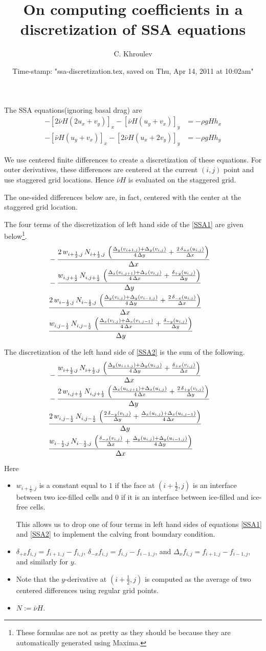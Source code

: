 \documentclass{amsart}
\date{Time-stamp: "ssa-discretization.tex, saved on Thu, Apr 14, 2011 at 10:02am"}
\begin{document}
\title{On computing coefficients in a discretization of SSA equations}
\author{C. Khroulev}
\maketitle

The SSA equations(ignoring basal drag) are
\begin{align}
-\left[ 2\bar\nu H\left( 2u_{x} + v_{y}\right)\right]_{x} - \left[\bar\nu
  H\left(u_{y}+v_{x} \right) \right]_{y} &= - \rho gH h_{x} \label{SSA1} \\
-\left[ \bar\nu H\left( u_{y} + v_{x} \right)\right]_{x} - \left[2\bar\nu
  H\left(u_{x}+2v_{y}  \right) \right]_{y} &= -\rho gH h_{y} \label{SSA2}
\end{align}

We use centered finite differences to create a discretization of these
equations. For outer derivatives, these differences are centered at the current
$(i,j)$ point and use staggered grid locations. Hence $\bar \nu H$ is evaluated on the staggered grid.

The one-sided differences below are, in fact, centered with the center at the
staggered grid location.

\medskip
The four terms of the discretization of left hand side of the \eqref{SSA1} are
given below\footnote{These formulas are not as pretty as they should be because
they are automatically generated using Maxima.}.
\begin{eqnarray*}
  \lhsI
\end{eqnarray*}

The discretization of the left hand side of \eqref{SSA2} is the sum of the following.
\begin{eqnarray*}
  \lhsII
\end{eqnarray*}

Here
\begin{itemize}
\item $w_{i+\frac12,j}$ is a constant equal to $1$ if the face at $(i+\frac12,j)$ is
  an interface between two ice-filled cells and $0$ if it is an interface
  between ice-filled and ice-free cells.

  This allows us to drop one of four terms in left hand sides of equations
  \eqref{SSA1} and \eqref{SSA2} to implement the calving front boundary
  condition.

\item $\delta_{+x}f_{i,j} = f_{i+1,j}-f_{i,j}$, $\delta_{-x}f_{i,j} =
  f_{i,j}-f_{i-1,j}$, and $\Delta_{x}f_{i,j} = f_{i+1,j}-f_{i-1,j}$, and
  similarly for $y$.
\item Note that the $y$-derivative at $(i+\frac12,j)$ is computed as the
  average of two centered differences using regular grid points.
\item $N := \bar \nu H$.
\end{itemize}
\end{document}

